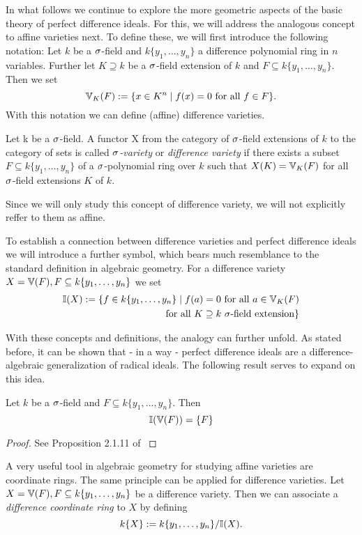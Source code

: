 In what follows we continue to explore the more geometric aspects of the basic theory of perfect difference ideals.
For this, we will address the analogous concept to affine varieties next. To define these, we will first introduce the following notation:
Let $k$ be a $\sigma$-field and $k\{y_1,\ldots,y_n\}$ a difference polynomial ring in $n$ variables. Further let $K \supseteq k$ be a $\sigma$-field extension of $k$ and $F \subseteq k\{y_1,\ldots,y_n\}$.
Then we set $$\mathbb{V}_K(F) := \{ x \in K^n \mid f(x) = 0 \text{ for all } f \in F \}.$$
With this notation we can define (affine) difference varieties.

\begin{defn}
Let k be a $\sigma$-field. A functor X from the category of $\sigma$-field extensions of $k$ to the category of sets is called \emph{$\sigma$-variety} or \emph{difference variety} 
 if there exists a subset $F \subseteq k\{y_1,\ldots,y_n\}$ of a $\sigma$-polynomial ring over $k$ such that $X(K) = \mathbb{V}_K(F)$ for all $\sigma$-field extensions $K$ of $k$.
\end{defn}

Since we will only study this concept of difference variety, we will not explicitly reffer to them as affine.

To establish a connection between difference varieties and perfect difference ideals we will introduce a further symbol, which bears much resemblance to the standard definition in algebraic geometry.
For a difference variety $X = \mathbb{V}(F), F \subseteq k\{y_1,\ldots,y_n\}$ we set 
\begin{align*} \mathbb{I}(X) := \{ f \in k\{y_1,\ldots,y_n \} \mid f(a) = 0 \text{ for all } a \in \mathbb{V}_K(F) \\ \text{ for all } K \supseteq k ~ \sigma \text{-field extension} \} \end{align*}

With these concepts and definitions, the analogy can further unfold. As stated before, it can be shown that - in a way - perfect difference ideals are a difference-algebraic generalization of radical ideals. The following result serves to expand on this idea.

\begin{prop}
Let $k$ be a $\sigma$-field and $F \subseteq k\{y_1,\ldots,y_n\}$. Then 
$$ \mathbb{I}(\mathbb{V}(F)) = \{F\}$$
\begin{proof}
See Proposition 2.1.11 of \cite{wibmer}
\end{proof}
\end{prop}

A very useful tool in algebraic geometry for studying affine varieties are coordinate rings. The same principle can be applied for difference varieties. Let $X = \mathbb{V}(F), F \subseteq k\{y_1,\ldots,y_n\}$  be a difference variety.
Then we can associate a \emph{difference coordinate ring}  to $X$ by 
defining $$ k\{X\} := k\{y_1,\ldots,y_n\}/\mathbb{I}(X).$$


